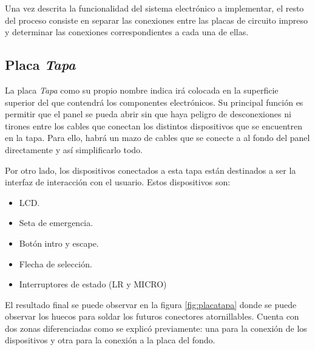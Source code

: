 Una vez descrita la funcionalidad del sistema electrónico a implementar, el resto del proceso consiste en 
separar las conexiones entre las placas de circuito impreso y determinar las conexiones correspondientes a 
cada una de ellas.

\subsection{Placa \textit{Tapa}}

La placa \textit{Tapa} como su propio nombre indica irá colocada en la superficie superior del que contendrá los componentes electrónicos. Su principal función es permitir que el panel se pueda abrir sin que haya peligro de desconexiones ni tirones entre los cables que conectan los distintos dispositivos que se encuentren en la tapa. Para ello, habrá un mazo de cables que se conecte a al fondo del panel directamente y así simplificarlo todo.

Por otro lado, los dispositivos conectados a esta tapa están destinados a ser la interfaz 
de interacción con el usuario. Estos dispositivos son:
\begin{itemize}
    \item LCD.
    \item Seta de emergencia.
    \item Botón intro y escape.
    \item Flecha de selección.
    \item Interruptores de estado (LR y MICRO)
\end{itemize}

El resultado final se puede observar en la figura \ref{fig:placatapa} donde se puede observar los 
huecos para soldar los futuros conectores atornillables. Cuenta con dos zonas diferenciadas como se 
explicó previamente: una para la conexión de los dispositivos y otra para la conexión a la placa del 
fondo.

